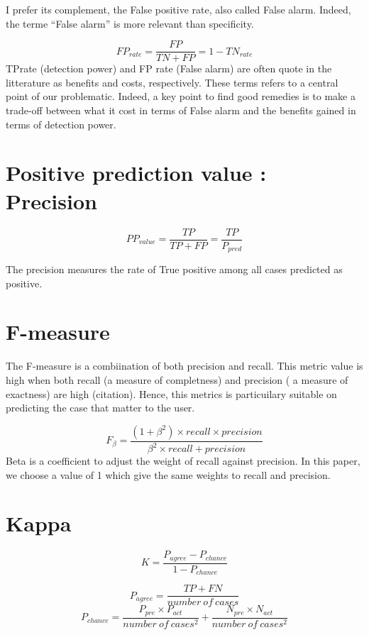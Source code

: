 \documentclass[
]{report}
\begin{document}
I prefer its complement, the False positive rate, also called False alarm. Indeed, the terme ``False alarm'' is more relevant than specificity.

\[FP_{rate} = \frac{FP}{TN+FP} = 1 - TN_{rate}\]
TPrate (detection power) and FP rate (False alarm) are often quote in the litterature as benefits and costs, respectively. These terms refers to a central point of our problematic. Indeed, a key point to find good remedies is to make a trade-off between what it cost in terms of False alarm and the benefits gained in terms of detection power.

\hypertarget{positive-prediction-value-precision}{%
\section{Positive prediction value : Precision}\label{positive-prediction-value-precision}}

\[PP_{value} = \frac{TP}{TP+FP} =  \frac{TP}{P_{pred}} \]

The precision measures the rate of True positive among all cases predicted as positive.

\hypertarget{f-measure}{%
\section{F-measure}\label{f-measure}}

The F-measure is a combiination of both precision and recall. This metric value is high when both recall (a measure of completness) and precision ( a measure of exactness) are high (citation). Hence, this metrics is particuilary suitable on predicting the case that matter to the user.

\[F_\beta = \frac{(1+\beta^2) \times recall \times precision}{\beta^2 \times recall + precision}\]
Beta is a coefficient to adjust the weight of recall against precision. In this paper, we choose a value of 1 which give the same weights to recall and precision.

\hypertarget{kappa}{%
\section{Kappa}\label{kappa}}

\[K = \frac{P_{agree}-P_{chance}}{1-P_{chance}}\]

\[P_{agree} = \frac{TP + FN} {number \ of \ cases} \]
\[P_{chance} = \frac{P_{pre} \times P_{act}}{number \ of \ cases^2}+\frac{N_{pre} \times N_{act}}{number \ of \ cases^2}\]
\end{document}
